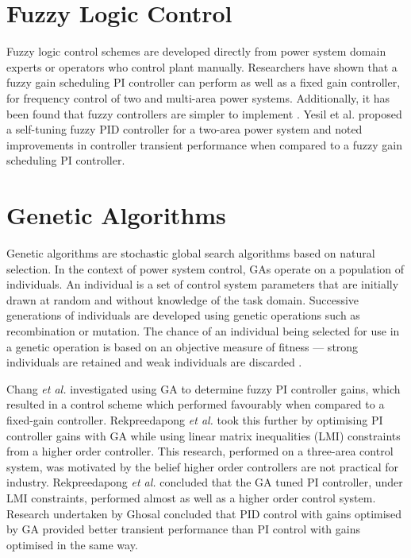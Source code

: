 \section{Fuzzy Logic Control}
Fuzzy logic control schemes are developed directly from power system domain experts or operators who control plant manually. Researchers have shown that a fuzzy gain scheduling PI controller can perform as well as a fixed gain controller, for frequency control of two and multi-area power systems. Additionally, it has been found that fuzzy controllers are simpler to implement \cite{Chang1997, Cam2005}. Yesil et al. \cite{Yesil2004} proposed a self-tuning fuzzy PID controller for a two-area power system and noted improvements in controller transient performance when compared to a fuzzy gain scheduling PI controller.

\section{Genetic Algorithms}
Genetic algorithms are stochastic global search algorithms based on natural selection. In the context of power system control, GAs operate on a population of individuals. An individual is a set of control system parameters that are initially drawn at random and without knowledge of the task domain. Successive generations of individuals are developed using genetic operations such as recombination or mutation. The chance of an individual being selected for use in a genetic operation is based on an objective measure of fitness --- strong individuals are retained and weak individuals are discarded \cite{Fleming1993}.

Chang \textit{et al.} \cite{Chang1998} investigated using GA to determine fuzzy PI controller gains, which resulted in a control scheme which performed favourably when compared to a fixed-gain controller. Rekpreedapong \textit{et al.} \cite{Rerkpreedapong2003} took this further by optimising PI controller gains with GA while using linear matrix inequalities (LMI) constraints from a higher order controller. This research, performed on a three-area control system, was motivated by the belief higher order controllers are not practical for industry. Rekpreedapong \textit{et al.} concluded that the GA tuned PI controller, under LMI constraints, performed almost as well as a higher order control system. Research undertaken by Ghosal \cite{Ghoshal2004} concluded that PID control with gains optimised by GA provided better transient performance than PI control with gains optimised in the same way.

